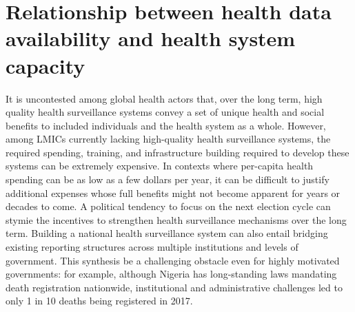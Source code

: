 \documentclass[
]{report}
\begin{document}
\hypertarget{relationship-between-health-data-availability-and-health-system-capacity}{%
\section{Relationship between health data availability and health system capacity}\label{relationship-between-health-data-availability-and-health-system-capacity}}

It is uncontested among global health actors that, over the long term, high quality health surveillance systems convey a set of unique health and social benefits to included individuals and the health system as a whole. However, among LMICs currently lacking high-quality health surveillance systems, the required spending, training, and infrastructure building required to develop these systems can be extremely expensive. In contexts where per-capita health spending can be as low as a few dollars per year, it can be difficult to justify additional expenses whose full benefits might not become apparent for years or decades to come. A political tendency to focus on the next election cycle can stymie the incentives to strengthen health surveillance mechanisms over the long term. Building a national health surveillance system can also entail bridging existing reporting structures across multiple institutions and levels of government. This synthesis be a challenging obstacle even for highly motivated governments: for example, although Nigeria has long-standing laws mandating death registration nationwide, institutional and administrative challenges led to only 1 in 10 deaths being registered in 2017.\autocite{Makinde2020}
\end{document}
